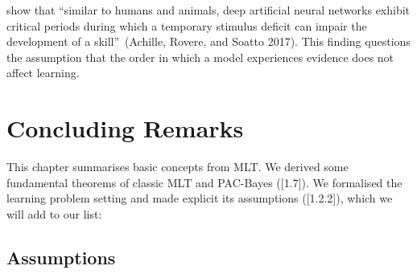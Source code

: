 \documentclass[
  letterpaper,
  12pt,
  british]{tufte-book}
\theoremstyle{plain}
\theoremstyle{definition}
\theoremstyle{plain}
\theoremstyle{remark}
\begin{document}
\begin{itemize}
  show that ``similar to humans and animals, deep artificial neural
  networks exhibit critical periods during which a temporary stimulus
  deficit can impair the development of a skill''~(Achille, Rovere, and
  Soatto
  2017).
  This finding questions the assumption that the order in which a model
  experiences evidence does not affect learning.
\end{itemize}

\hypertarget{concluding-remarks-2}{%
\section{Concluding Remarks}\label{concluding-remarks-2}}

This chapter summarises basic concepts from {MLT}. We derived some
fundamental theorems of classic {MLT} and PAC-Bayes ({[}1.7{]}). We
formalised the learning problem setting and made explicit its
assumptions ({[}1.2.2{]}), which we will add to our list:

\hypertarget{assumptions}{%
\subsection{Assumptions}\label{assumptions}}
\end{document}
